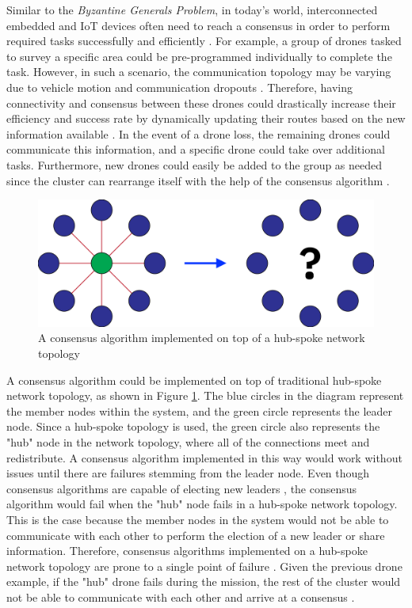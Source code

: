 Similar to the \textit{Byzantine Generals Problem}, in today's world, interconnected embedded and IoT devices often need to reach a consensus in order to perform required tasks successfully and efficiently \cite{Orostica_Nunez_2019}. For example, a group of drones tasked to survey a specific area could be pre-programmed individually to complete the task. However, in such a scenario, the communication topology may be varying due to vehicle motion and communication dropouts \cite{moreau2004stability} \cite{munoz2017adaptive}. Therefore, having connectivity and consensus between these drones could drastically increase their efficiency and success rate by dynamically updating their routes based on the new information available \cite{ren2007information}. In the event of a drone loss, the remaining drones could communicate this information, and a specific drone could take over additional tasks. Furthermore, new drones could easily be added to the group as needed since the cluster can rearrange itself with the help of the consensus algorithm \cite{chen2020achieving}.




\begin{figure}[H]
    \centering
    \includegraphics[width=0.5\columnwidth]{final-proposal/images/consensus_traditional.png}
    \caption{A consensus algorithm implemented on top of a hub-spoke network topology}
    \label{fig:consensus_traditional}
\end{figure}

A consensus algorithm could be implemented on top of traditional hub-spoke network topology, as shown in Figure \ref{fig:consensus_traditional}. The blue circles in the diagram represent the member nodes within the system, and the green circle represents the leader node. Since a hub-spoke topology is used, the green circle also represents the "hub" node in the network topology, where all of the connections meet and redistribute. A consensus algorithm implemented in this way would work without issues until there are failures stemming from the leader node. Even though consensus algorithms are capable of electing new leaders \cite{raft_paper}, the consensus algorithm would fail when the "hub" node fails in a hub-spoke network topology. This is the case because the member nodes in the system would not be able to communicate with each other to perform the election of a new leader or share information. Therefore, consensus algorithms implemented on a hub-spoke network topology are prone to a single point of failure \cite{karatas2020multi}. Given the previous drone example, if the "hub" drone fails during the mission, the rest of the cluster would not be able to communicate with each other and arrive at a consensus \cite{ren2007information}.

